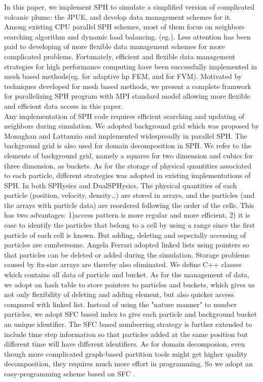 \documentclass[conference,compsoc]{IEEEtran}
\begin{document}
In this paper, we implement SPH to simulate a simplified version of complicated volcanic plume: the JPUE, and develop data management schemes for it.\\
Among existing CPU parallel SPH schemes, most of them focus on neighbors searching algorithm and dynamic load balancing. (eg.\cite{ferrari2009new, crespo2015dualsphysics}). Less attention has been paid to developing of more flexible data management schemes for more complicated problems. 
Fortunately, efficient and flexible data management strategies for high performance computing have been successfully implemented in mesh based methods(eg. \cite{laszloffy2000simple} for adaptive hp FEM, and \cite{pitman2003computing, patra2005parallel} for FVM). Motivated by techniques developed for mesh based methods, we present a complete framwork for parallelizing SPH program with MPI standard model allowing more flexible and efficient data access in this paper.\\
Any implementation of SPH code requires efficient searching and updating of neighbors during simulation. We adopted background grid which was proposed by Monaghan and Lattanzio\cite{monaghan1985refined} and implemented widespreadly in parallel SPH. The background grid is also used for domain decomposition in SPH. We refer to the elements of background grid, namely a squares for two dimension and cubics for three dimension, as buckets. As for the storage of physical quantities associated to each particle, different strategies was adopted in existing implementations of SPH. 
In both SPHysics\cite{dominguez2011optimization} and DualSPHysics\cite{crespo2015dualsphysics}, The physical quantities of each particle (position, velocity, density…) are stored in arrays, and the particles (and the arrays with particle data) are reordered following the order of the cells. This has two advantages: 1)access pattern is more regular and more efficient, 2) it is ease to identify the particles that belong to a cell by using a range since the first particle of each cell is known. But adding, deleting and especially accessing of particles are cumbersome. Angela Ferrari\cite{ferrari2009new} adopted linked lists using pointers so that particles can be deleted or added during the simulation. Storage problems caused by fix-size arrays are thereby also eliminated. We define C++ classes which contains all data of particle and bucket. As for the management of data, we adopt an hash table to store pointers to particles and buckets, which gives us not only flexibility of deleting and adding element, but also quicker access compared with linked list. Instead of using the "nature manner" to number particles, we adopt SFC based index to give each particle and background bucket an unique identifier. The SFC based numberring strategy is further extended to include time step information so that particles added at the same position but different time will have different identifiers. As for domain decomposion, even though more complicated graph-based partition tools\cite{biswas1999experiments} might get higher quality decomposition, they requires much more effort in programming. So we adopt an easy-programming scheme based on SFC \cite{patra1999efficient}.\\
\end{document}
